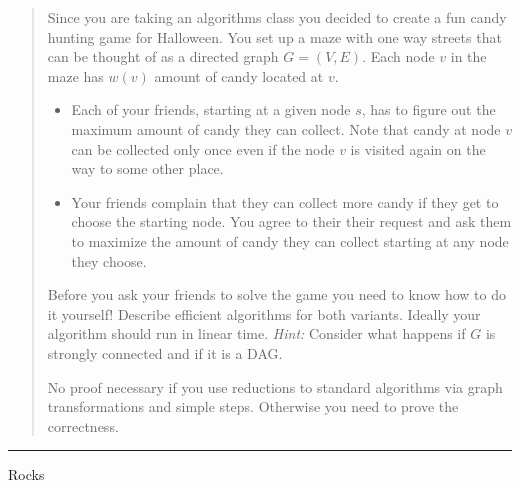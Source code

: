 \documentclass[11pt]{article}
\begin{document}

\begin{quote}
Since you are taking an algorithms class you decided to create a
  fun candy hunting game for Halloween. You set up a maze with one
  way streets that can be thought of as a directed graph
  $G=(V,E)$. Each node $v$ in the maze has $w(v)$ amount of candy
  located at $v$.
  \begin{itemize}
  \item Each of your friends, starting at a given node $s$, has to
    figure out the maximum amount of candy they can collect. Note that
    candy at node $v$ can be collected only once even if the node $v$
    is visited again on the way to some other place.
  \item Your friends complain that they can collect more candy if they
    get to choose the starting node. You agree to their their request
    and ask them to maximize the amount of candy they can collect
    starting at any node they choose.
  \end{itemize}
  Before you ask your friends to solve the game you need to know how
  to do it yourself!  Describe efficient algorithms for both variants.
  Ideally your algorithm should run in linear time.
  {\em Hint:} Consider what happens if $G$ is strongly connected and
  if it is a DAG.

  No proof necessary if you use reductions to standard algorithms via
  graph transformations and simple steps. Otherwise you need to prove
  the correctness.
\end{quote}
\hrule



\begin{solution}
    Rocks
\end{solution}
\end{document}

